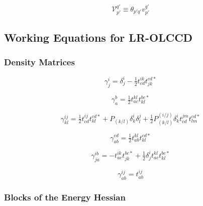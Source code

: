 \begin{subappendices}
    \begin{equation}
        \mathcal{V}_{p'}^{q'}
        \equiv
        \theta_{p'q'}
        v_{p'}^{q'}
    \end{equation}

    \subsection{Working Equations for LR-OLCCD}

    \subsubsection{Density Matrices}

    \begin{equation}
        \gamma^i_j
        =
        \delta^i_j
        -
        \tfrac{1}{2}
        t_{cd}^{ik}
        t_{jk}^{cd*}
    \end{equation}

    \begin{equation}
        \gamma^b_a
        =
        \tfrac{1}{2}
        t_{ac}^{kl}
        t_{kl}^{bc*}
    \end{equation}

    \begin{equation}
        \gamma^{ij}_{kl}
        =
        \tfrac{1}{2}
        t_{cd}^{ij}
        t_{kl}^{cd*}
        +
        P_{(k/l)}
        \delta^i_k
        \delta^j_l
        +
        \tfrac{1}{2}
        P_{(k/l)}^{(i/j)}
        \delta^i_k
        t_{cd}^{jm}
        t_{lm}^{cd*}
    \end{equation}

    \begin{equation}
        \gamma_{ab}^{cd}
        =
        \tfrac{1}{2}
        t_{ab}^{kl}
        t_{kl}^{cd*}
    \end{equation}

    \begin{equation}
        \gamma_{ja}^{ib}
        =
        -
        t_{ac}^{ik}
        t_{jk}^{bc*}
        +
        \tfrac{1}{2}
        \delta^i_j
        t_{ac}^{kl}
        t_{kl}^{bc*}
    \end{equation}

    \begin{equation}
        \gamma_{ab}^{ij}
        =
        t_{ab}^{ij}
    \end{equation}

    \subsubsection{Blocks of the Energy Hessian}


\end{subappendices}
